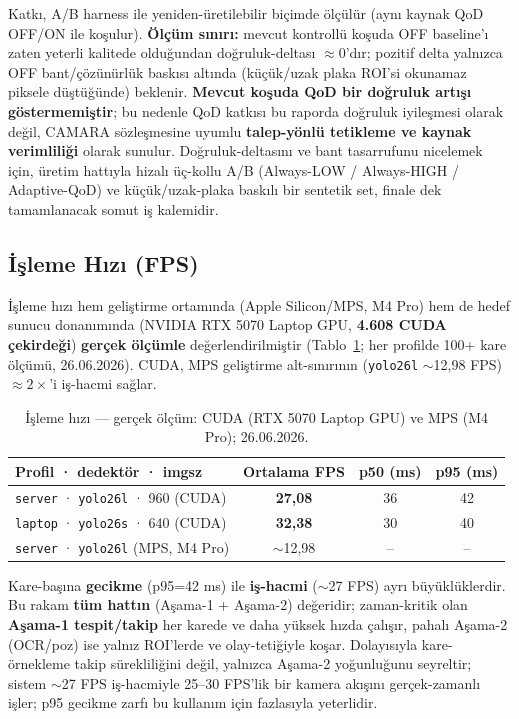 \documentclass[12pt,a4paper]{article}
\newcommand{\tcode}[1]{\texttt{\small #1}}
\begin{document}
Katkı, A/B harness ile yeniden-üretilebilir biçimde ölçülür (aynı kaynak QoD OFF/ON ile koşulur).
\textbf{Ölçüm sınırı:} mevcut kontrollü koşuda OFF baseline'ı zaten yeterli kalitede olduğundan
doğruluk-deltası $\approx$0'dır; pozitif delta yalnızca OFF bant/çözünürlük baskısı altında (küçük/uzak
plaka ROI'si okunamaz piksele düştüğünde) beklenir. \textbf{Mevcut koşuda QoD bir doğruluk artışı
göstermemiştir}; bu nedenle QoD katkısı bu raporda doğruluk iyileşmesi olarak değil, CAMARA sözleşmesine
uyumlu \textbf{talep-yönlü tetikleme ve kaynak verimliliği} olarak sunulur. Doğruluk-deltasını ve bant
tasarrufunu nicelemek için, üretim hattıyla hizalı üç-kollu A/B (Always-LOW / Always-HIGH / Adaptive-QoD)
ve küçük/uzak-plaka baskılı bir sentetik set, finale dek tamamlanacak somut iş kalemidir.

\subsection{İşleme Hızı (FPS)}
İşleme hızı hem geliştirme ortamında (Apple Silicon/MPS, M4 Pro) hem de hedef sunucu donanımında
(NVIDIA RTX 5070 Laptop GPU, \textbf{4.608 CUDA çekirdeği}) \textbf{gerçek ölçümle} değerlendirilmiştir
(Tablo~\ref{tab:fps}; her profilde 100+ kare ölçümü, 26.06.2026). CUDA,
MPS geliştirme alt-sınırının (\tcode{yolo26l} $\sim$12,98 FPS) \textbf{${\approx}2\times$}'i iş-hacmi sağlar.

\begin{table}[H]\centering\small
\caption{İşleme hızı — gerçek ölçüm: CUDA (RTX 5070 Laptop GPU) ve MPS (M4 Pro); 26.06.2026.}\label{tab:fps}
\begin{tabularx}{\textwidth}{>{\raggedright\arraybackslash}X ccc}
\toprule
\textbf{Profil · dedektör · imgsz} & \textbf{Ortalama FPS} & \textbf{p50 (ms)} & \textbf{p95 (ms)} \\ \midrule
\tcode{server} · \tcode{yolo26l} · 960 (CUDA) & \textbf{27,08} & 36 & 42 \\
\tcode{laptop} · \tcode{yolo26s} · 640 (CUDA) & \textbf{32,38} & 30 & 40 \\
\tcode{server} · \tcode{yolo26l} (MPS, M4 Pro) & $\sim$12,98 & -- & -- \\
\bottomrule
\end{tabularx}
\end{table}

Kare-başına \textbf{gecikme} (p95=42 ms) ile \textbf{iş-hacmi} (${\sim}$27 FPS) ayrı büyüklüklerdir.
Bu rakam \textbf{tüm hattın} (Aşama-1 + Aşama-2) değeridir; zaman-kritik olan \textbf{Aşama-1 tespit/takip}
her karede ve daha yüksek hızda çalışır, pahalı Aşama-2 (OCR/poz) ise yalnız ROI'lerde ve olay-tetiğiyle
koşar. Dolayısıyla kare-örnekleme takip sürekliliğini değil, yalnızca Aşama-2 yoğunluğunu seyreltir;
sistem ${\sim}$27 FPS iş-hacmiyle 25--30 FPS'lik bir kamera akışını gerçek-zamanlı işler; p95 gecikme
zarfı bu kullanım için fazlasıyla yeterlidir.
\end{document}
